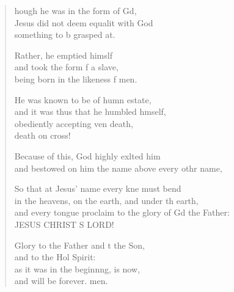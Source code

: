 \begin{verse}
  \begin{patverse}
    hough he was in the form of Gd,\Flex\\
    Jesus did not deem equalit with God\Med\\
    something to b grasped at.
    
    Rather, he emptied himslf\Flex\\
    and took the form f a slave,\Med\\
    being born in the likeness f men.
    
    He was known to be of humn estate,\Med\\
    and it was thus that he humbled h\pointup{\i}mself,\\
    obediently accepting ven death,\Med\\
    death on  cross!
    
    Because of this, God highly exlted him\Med\\
    and bestowed on him the name above every othr name,
    
    So that at Jesus’ name every kne must bend\Med\\
    in the heavens, on the earth, and under th earth,\\
    and every tongue proclaim to the glory of Gd the Father:\Med\\
    JESUS CHRIST S LORD!

    Glory to the Father and t the Son,\Med\\
    and to the Hol Spirit:\\
    as it was in the beginn\pointup{\i}ng, is now,\Med\\
    and will be forever. men.
  \end{patverse}
\end{verse}
